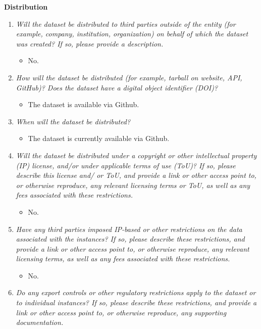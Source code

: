 \documentclass[
]{article}
\providecommand{\tightlist}{%
  \setlength{\itemsep}{0pt}\setlength{\parskip}{0pt}}
\begin{document}
\textbf{Distribution}

\begin{enumerate}
\def\labelenumi{\arabic{enumi}.}
\tightlist
\item
  \emph{Will the dataset be distributed to third parties outside of the
  entity (for example, company, institution, organization) on behalf of
  which the dataset was created? If so, please provide a description.}

  \begin{itemize}
  \tightlist
  \item
    No.
  \end{itemize}
\item
  \emph{How will the dataset be distributed (for example, tarball on
  website, API, GitHub)? Does the dataset have a digital object
  identifier (DOI)?}

  \begin{itemize}
  \tightlist
  \item
    The dataset is available via Github.
  \end{itemize}
\item
  \emph{When will the dataset be distributed?}

  \begin{itemize}
  \tightlist
  \item
    The dataset is currently available via Github.
  \end{itemize}
\item
  \emph{Will the dataset be distributed under a copyright or other
  intellectual property (IP) license, and/or under applicable terms of
  use (ToU)? If so, please describe this license and/ or ToU, and
  provide a link or other access point to, or otherwise reproduce, any
  relevant licensing terms or ToU, as well as any fees associated with
  these restrictions.}

  \begin{itemize}
  \tightlist
  \item
    No.
  \end{itemize}
\item
  \emph{Have any third parties imposed IP-based or other restrictions on
  the data associated with the instances? If so, please describe these
  restrictions, and provide a link or other access point to, or
  otherwise reproduce, any relevant licensing terms, as well as any fees
  associated with these restrictions.}

  \begin{itemize}
  \tightlist
  \item
    No.
  \end{itemize}
\item
  \emph{Do any export controls or other regulatory restrictions apply to
  the dataset or to individual instances? If so, please describe these
  restrictions, and provide a link or other access point to, or
  otherwise reproduce, any supporting documentation.}


\end{enumerate}
\end{document}
